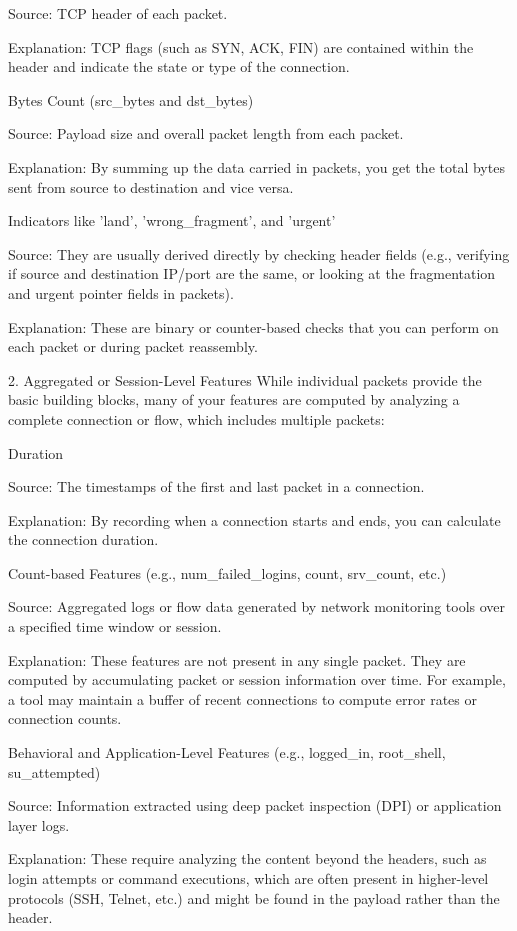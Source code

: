 \documentclass{article}
\begin{document}
Source: TCP header of each packet.

Explanation: TCP flags (such as SYN, ACK, FIN) are contained within the header and indicate the state or type of the connection.

Bytes Count (src_bytes and dst_bytes)

Source: Payload size and overall packet length from each packet.

Explanation: By summing up the data carried in packets, you get the total bytes sent from source to destination and vice versa.

Indicators like 'land', 'wrong_fragment', and 'urgent'

Source: They are usually derived directly by checking header fields (e.g., verifying if source and destination IP/port are the same, or looking at the fragmentation and urgent pointer fields in packets).

Explanation: These are binary or counter-based checks that you can perform on each packet or during packet reassembly.

2. Aggregated or Session-Level Features
While individual packets provide the basic building blocks, many of your features are computed by analyzing a complete connection or flow, which includes multiple packets:

Duration

Source: The timestamps of the first and last packet in a connection.

Explanation: By recording when a connection starts and ends, you can calculate the connection duration.

Count-based Features (e.g., num_failed_logins, count, srv_count, etc.)

Source: Aggregated logs or flow data generated by network monitoring tools over a specified time window or session.

Explanation: These features are not present in any single packet. They are computed by accumulating packet or session information over time. For example, a tool may maintain a buffer of recent connections to compute error rates or connection counts.

Behavioral and Application-Level Features (e.g., logged_in, root_shell, su_attempted)

Source: Information extracted using deep packet inspection (DPI) or application layer logs.

Explanation: These require analyzing the content beyond the headers, such as login attempts or command executions, which are often present in higher-level protocols (SSH, Telnet, etc.) and might be found in the payload rather than the header.
\end{document}
